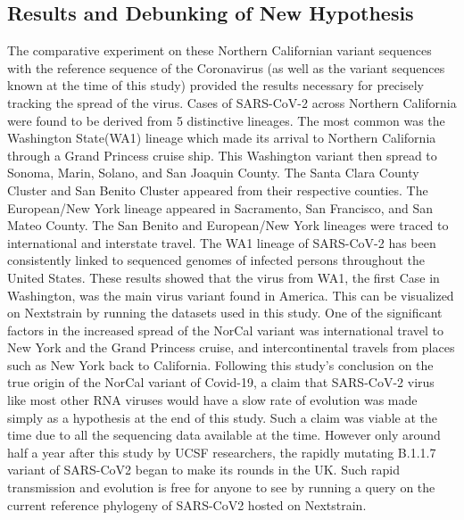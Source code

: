 \documentclass[12pt,journal,compsoc]{IEEEtran}
\begin{document}
\subsection*{Results and Debunking of New Hypothesis}
The comparative experiment on these Northern Californian variant sequences with the reference sequence of the Coronavirus (as well as the variant sequences known at the time of this study) provided the results necessary for precisely tracking the spread of the virus. Cases of SARS-CoV-2 across Northern California were found to be derived from 5 distinctive lineages. The most common was the Washington State(WA1) lineage which made its arrival to Northern California through a Grand Princess cruise ship. This Washington variant then spread to Sonoma, Marin, Solano, and San Joaquin County. The Santa Clara County Cluster and San Benito Cluster appeared from their respective counties. The European/New York lineage appeared in Sacramento, San Francisco, and San Mateo County. The San Benito and European/New York lineages were traced to international and interstate travel. The WA1 lineage of SARS-CoV-2 has been consistently linked to sequenced genomes of infected persons throughout the United States. These results showed that the virus from WA1, the first Case in Washington, was the main virus variant found in America. This can be visualized on Nextstrain by running the datasets used in this study. One of the significant factors in the increased spread of the NorCal variant was international travel to New York and the Grand Princess cruise, and intercontinental travels from places such as New York back to California. Following this study's conclusion on the true origin of the NorCal variant of Covid-19, a claim that SARS-CoV-2 virus like most other RNA viruses would have a slow rate of evolution was made simply as a hypothesis at the end of this study. Such a claim was viable at the time due to all the sequencing data available at the time. However only around half a year after this study by UCSF researchers, the rapidly mutating B.1.1.7 variant of SARS-CoV2 began to make its rounds in the UK. Such rapid transmission and evolution is free for anyone to see by running a query on the current reference phylogeny of SARS-CoV2 hosted on Nextstrain.
\end{document}
